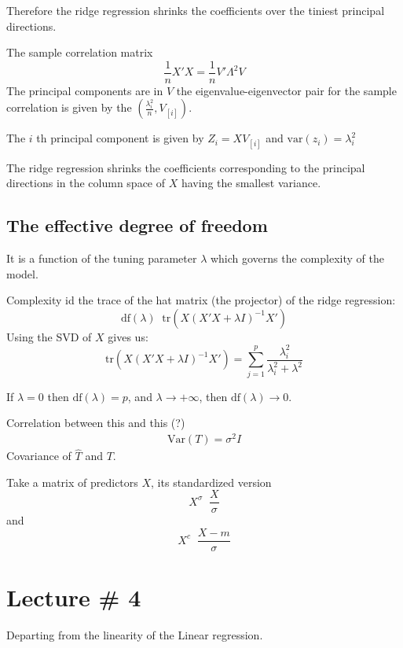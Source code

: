 \documentclass[a4paper]{article}
\newcommand{\clo}[1]{{\left [ #1 \right ]}}
\newcommand{\brac}[1]{{\left ( #1 \right )}}
\newcommand{\defn}{\mathop{\overset{\Delta}{=}}\nolimits}
\begin{document}
Therefore the ridge regression shrinks the coefficients over the tiniest principal directions.

The sample correlation matrix
\[\frac{1}{n} X'X = \frac{1}{n} V'\Lambda^2 V\]
The principal components are in $V$
the eigenvalue-eigenvector pair for the sample correlation is given by the $\brac{\frac{\lambda_i^2}{n}, V_\clo{i}}$.

The $i$ th principal component is given by $Z_i = X V_\clo{i}$ and $\text{var}(z_i) = \lambda_i^2$

The ridge regression shrinks the coefficients corresponding to the principal directions in the column space of $X$ having the smallest variance.


\subsection*{The effective degree of freedom} %
\label{sub:the_effective_degree_of_freedom}

It is a function of the tuning parameter $\lambda$ which governs the complexity of the model.

Complexity id the trace of the hat matrix (the projector) of the ridge regression:
\[\text{df}(\lambda) \defn \text{tr}\brac{X\brac{X'X + \lambda I}^{-1}X'}\]
Using the SVD of $X$ gives us:
\[\text{tr}\brac{X\brac{X'X + \lambda I}^{-1}X'} = \sum_{j=1}^p \frac{\lambda_i^2}{\lambda_i^2 + \lambda^2}\]

If $\lambda = 0$ then $\text{df}(\lambda) = p$, and $\lambda\to +\infty$, then $\text{df}(\lambda) \to 0$.

Correlation between this and this (?)
\begin{align*}
	\text{Var}(T) = \sigma^2 I
\end{align*}
Covariance of $\hat{T}$ and $T$.


Take a matrix of predictors $X$, its standardized version \[X^\sigma \defn \frac{X}{\sigma}\]
and \[X^c \defn \frac{X-m}{\sigma}\]



\section{Lecture \# 4} %
\label{sec:lecture_4}
Departing from the linearity of the Linear regression.
\end{document}
